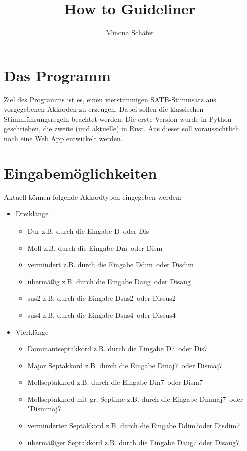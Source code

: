 \documentclass[11.5pt,a4paper]{article}
\title{How to Guideliner}
\author{Minona Schäfer}
\date{ }
\begin{document}
\maketitle


	
\section{Das Programm}
Ziel des Programms ist es, einen vierstimmigen SATB-Stimmsatz aus vorgegebenen Akkorden zu erzeugen. Dabei sollen die klassischen Stimmführungsregeln beachtet werden. Die erste Version wurde in Python geschrieben, die zweite (und aktuelle) in Rust. Aus dieser soll voraussichtlich noch eine Web App entwickelt werden.

\section{Eingabemöglichkeiten}
	Aktuell können folgende Akkordtypen eingegeben werden: 
	
	\begin{itemize}
		\item Dreiklänge 
		\begin{itemize}
			\item Dur z.B. durch die Eingabe \glqq D\grqq \ oder \glqq Dis\grqq
			\item Moll z.B. durch die Eingabe \glqq Dm\grqq \ oder \glqq Dism\grqq
			\item vermindert z.B. durch die Eingabe \glqq Ddim\grqq \ oder \glqq Disdim\grqq
			\item übermäßig z.B. durch die Eingabe \glqq Daug\grqq \ oder \glqq Disaug\grqq
			\item sus2 z.B. durch die Eingabe \glqq Dsus2\grqq \ oder \glqq Dissus2\grqq
			\item sus4 z.B. durch die Eingabe \glqq Dsus4\grqq \ oder \glqq Dissus4\grqq
		\end{itemize}
		\item Vierklänge
		\begin{itemize}
			\item Dominantseptakkord z.B. durch die Eingabe \glqq D7\grqq \ oder \glqq Dis7\grqq
			\item Major Septakkord z.B. durch die Eingabe \glqq Dmaj7\grqq \ oder \glqq Dismaj7\grqq
			\item Mollseptakkord z.B. durch die Eingabe \glqq Dm7\grqq \ oder \glqq Dism7\grqq
			\item Mollseptakkord mit gr. Septime z.B. durch die Eingabe \glqq Dmmaj7\grqq \ oder "Dismmaj7\grqq
			\item verminderter Septakkord z.B. durch die Eingabe \glqq Ddim7\grqq oder \glqq Disdim7\grqq
			\item übermäßiger Septakkord z.B. durch die Eingabe \glqq Daug7 \grqq oder \glqq Disaug7\grqq
		\end{itemize}
	\end{itemize}
\end{document}
